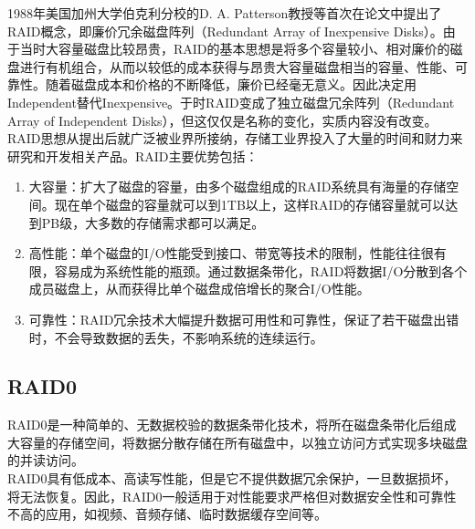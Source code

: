1988年美国加州大学伯克利分校的D. A. Patterson教授等首次在论文中提出了RAID概念，即廉价冗余磁盘阵列（Redundant Array of Inexpensive Disks）。由于当时大容量磁盘比较昂贵，RAID的基本思想是将多个容量较小、相对廉价的磁盘进行有机组合，从而以较低的成本获得与昂贵大容量磁盘相当的容量、性能、可靠性。随着磁盘成本和价格的不断降低，廉价已经毫无意义。因此决定用Independent替代Inexpensive。于时RAID变成了独立磁盘冗余阵列（Redundant Array of Independent Disks），但这仅仅是名称的变化，实质内容没有改变。\\

RAID思想从提出后就广泛被业界所接纳，存储工业界投入了大量的时间和财力来研究和开发相关产品。RAID主要优势包括：

\begin{enumerate}
	\item 大容量：扩大了磁盘的容量，由多个磁盘组成的RAID系统具有海量的存储空间。现在单个磁盘的容量就可以到1TB以上，这样RAID的存储容量就可以达到PB级，大多数的存储需求都可以满足。

	\item 高性能：单个磁盘的I/O性能受到接口、带宽等技术的限制，性能往往很有限，容易成为系统性能的瓶颈。通过数据条带化，RAID将数据I/O分散到各个成员磁盘上，从而获得比单个磁盘成倍增长的聚合I/O性能。

	\item 可靠性：RAID冗余技术大幅提升数据可用性和可靠性，保证了若干磁盘出错时，不会导致数据的丢失，不影响系统的连续运行。
\end{enumerate}

\vspace{0.5cm}

\subsection{RAID0}

RAID0是一种简单的、无数据校验的数据条带化技术，将所在磁盘条带化后组成大容量的存储空间，将数据分散存储在所有磁盘中，以独立访问方式实现多块磁盘的并读访问。\\

RAID0具有低成本、高读写性能，但是它不提供数据冗余保护，一旦数据损坏，将无法恢复。因此，RAID0一般适用于对性能要求严格但对数据安全性和可靠性不高的应用，如视频、音频存储、临时数据缓存空间等。

\begin{figure}[H]
	\centering
\end{figure}

